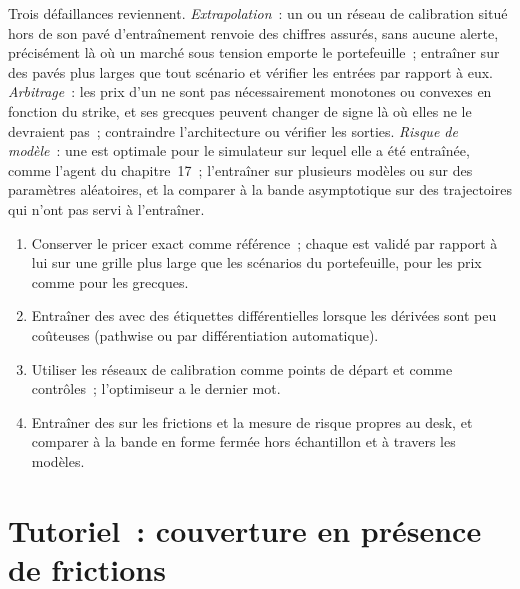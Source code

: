 Trois défaillances reviennent. \emph{Extrapolation}~: un  ou un réseau de calibration situé hors de son pavé d'entraînement renvoie des chiffres
assurés, sans aucune alerte, précisément là où un marché sous tension emporte le portefeuille~; entraîner sur des pavés plus larges que tout scénario et vérifier
les entrées par rapport à eux. \emph{Arbitrage}~: les prix d'un  ne sont pas nécessairement monotones ou convexes en fonction du strike, et ses grecques peuvent
changer de signe là où elles ne le devraient pas~; contraindre l'architecture ou vérifier les sorties. \emph{Risque de modèle}~: une  est optimale
pour le simulateur sur lequel elle a été entraînée, comme l'agent du chapitre~17~; l'entraîner sur plusieurs modèles ou sur des paramètres aléatoires, et
la comparer à la bande asymptotique sur des trajectoires qui n'ont pas servi à l'entraîner.

\begin{method}\label{met:ml:dh:method}
\begin{enumerate}
\item Conserver le pricer exact comme référence~; chaque  est validé par rapport à lui sur une grille plus large que les
scénarios du portefeuille, pour les prix comme pour les grecques.
\item Entraîner des  avec des étiquettes différentielles lorsque les dérivées sont peu coûteuses (pathwise ou par différentiation automatique).
\item Utiliser les réseaux de calibration comme points de départ et comme contrôles~; l'optimiseur a le dernier mot.
\item Entraîner des  sur les frictions et la mesure de risque propres au desk, et comparer à la bande en forme fermée hors échantillon et
à travers les modèles.
\end{enumerate}
\end{method}

\section{Tutoriel~: couverture en présence de frictions}\label{tut:ml:deep-hedging-and-machine-learning-in-pricing:tut}

